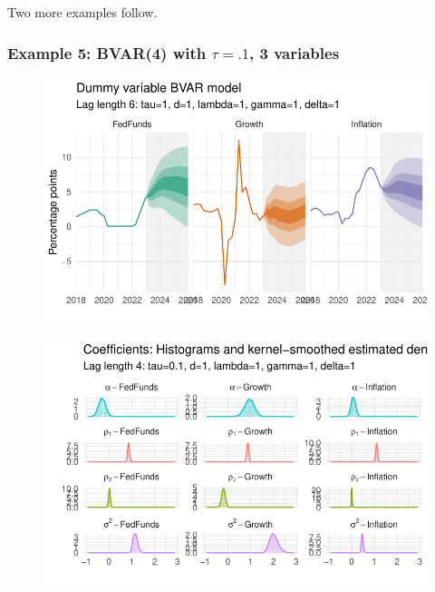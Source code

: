 \documentclass[
  letterpaper,
]{book}
\begin{document}
Two more examples follow.

\hypertarget{example-5-bvar4-with-tau.1-3-variables}{%
\subsubsection{\texorpdfstring{Example 5: BVAR(4) with \(\tau=.1\), 3
variables}{Example 5: BVAR(4) with \textbackslash tau=.1, 3 variables}}\label{example-5-bvar4-with-tau.1-3-variables}}

\begin{figure}

{\centering \includegraphics{BVAR_files/figure-pdf/estim-1.pdf}

}

\end{figure}

\begin{figure}

{\centering \includegraphics{BVAR_files/figure-pdf/unnamed-chunk-12-1.pdf}

}

\end{figure}
\end{document}
